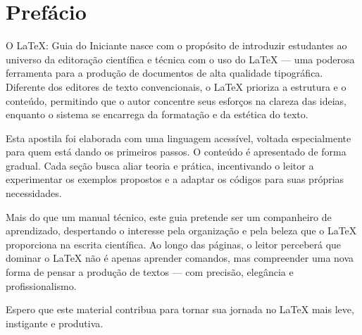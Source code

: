 \section*{Prefácio}


O LaTeX: Guia do Iniciante nasce com o propósito de introduzir estudantes ao universo da editoração científica e técnica com o uso do LaTeX — uma poderosa ferramenta para a produção de documentos de alta qualidade tipográfica. Diferente dos editores de texto convencionais, o LaTeX prioriza a estrutura e o conteúdo, permitindo que o autor concentre seus esforços na clareza das ideias, enquanto o sistema se encarrega da formatação e da estética do texto.

Esta apostila foi elaborada com uma linguagem acessível, voltada especialmente para quem está dando os primeiros passos. O conteúdo é apresentado de forma gradual. Cada seção busca aliar teoria e prática, incentivando o leitor a experimentar os exemplos propostos e a adaptar os códigos para suas próprias necessidades.

Mais do que um manual técnico, este guia pretende ser um companheiro de aprendizado, despertando o interesse pela organização e pela beleza que o LaTeX proporciona na escrita científica. Ao longo das páginas, o leitor perceberá que dominar o LaTeX não é apenas aprender comandos, mas compreender uma nova forma de pensar a produção de textos — com precisão, elegância e profissionalismo.

Espero que este material contribua para tornar sua jornada no LaTeX mais leve, instigante e produtiva.